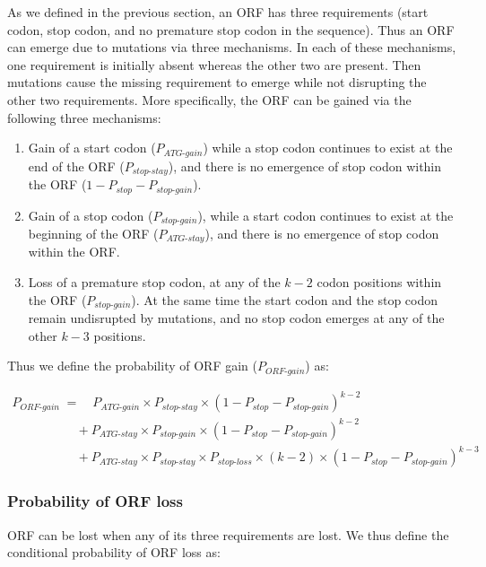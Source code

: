 \documentclass[12pt,a4paper]{article}
\begin{document}
As we defined in the previous section, an ORF has three requirements (start codon, stop codon, and no premature stop codon in the sequence). Thus an ORF can emerge due to mutations via three mechanisms. In each of these mechanisms, one requirement is initially absent whereas the other two are present. Then mutations cause the missing requirement to emerge while not disrupting the other two requirements. More specifically, the ORF can be gained via the following three mechanisms:
\begin{enumerate}
\item Gain of a start codon ($P_\textit{ATG-gain}$) while a stop codon continues to exist at the end of the ORF ($P_\textit{stop-stay}$), and there is no emergence of stop codon within the ORF ($1- P_\textit{stop} - P_\textit{stop-gain}$).
\item Gain of a stop codon ($P_\textit{stop-gain}$), while a start codon continues to exist at the beginning of the ORF ($P_\textit{ATG-stay}$), and there is no emergence of stop codon within the ORF.
\item Loss of a premature stop codon, at any of the $k-2$ codon positions within the ORF ($P_\textit{stop-gain}$). At the same time the start codon and the stop codon remain undisrupted by mutations, and no stop codon emerges at any of the other $k-3$ positions.
\end{enumerate} 

Thus we define the probability of ORF gain ($P_\textit{ORF-gain}$) as:

\begin{align}
P_\textit{ORF-gain} & = \quad P_\textit{ATG-gain}\times P_\textit{stop-stay} \times (1- P_\textit{stop} - P_\textit{stop-gain})^{k-2} \nonumber \\[1pt]
& \quad + P_\textit{ATG-stay}\times P_\textit{stop-gain} \times (1- P_\textit{stop} - P_\textit{stop-gain})^{k-2} \nonumber \\[1pt]
& \quad + P_\textit{ATG-stay}\times P_\textit{stop-stay} \times P_\textit{stop-loss}\times(k-2) \times (1- P_\textit{stop} - P_\textit{stop-gain})^{k-3} 
\label{eqorfgain}
\end{align}

\subsubsection{Probability of ORF loss}

ORF can be lost when any of its three requirements are lost. We thus define the conditional probability of ORF loss as:
\end{document}
